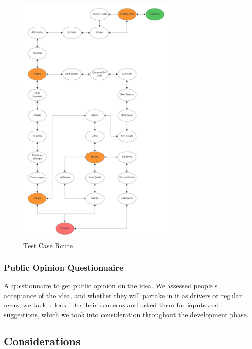\documentclass[a4paper, 12pt]{report} %
\begin{document}
                \begin{figure}[H]
                    \centering
                    \includegraphics[width=0.7\textwidth, keepaspectratio]{Images/Route_Text_Case.png}
                    \caption{Test Case Route\protect \footnotemark[1]}
                    \label{fig:testcase_route}
                \end{figure}

                \pagebreak
                
            \subsubsection{Public Opinion Questionnaire}
                A questionnaire to get public opinion on the idea. We assessed people’s acceptance of the idea, and whether they will partake in it as drivers or regular users, we took a look into their concerns and asked them for inputs and suggestions, which we took into consideration throughout the development phase.
            \subsection{Considerations}
\end{document}
